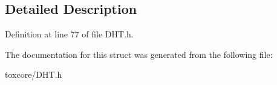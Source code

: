 \subsection{Detailed Description}


Definition at line 77 of file D\+H\+T.\+h.



The documentation for this struct was generated from the following file\+:\begin{DoxyCompactItemize}
\item 
toxcore/D\+H\+T.\+h\end{DoxyCompactItemize}
